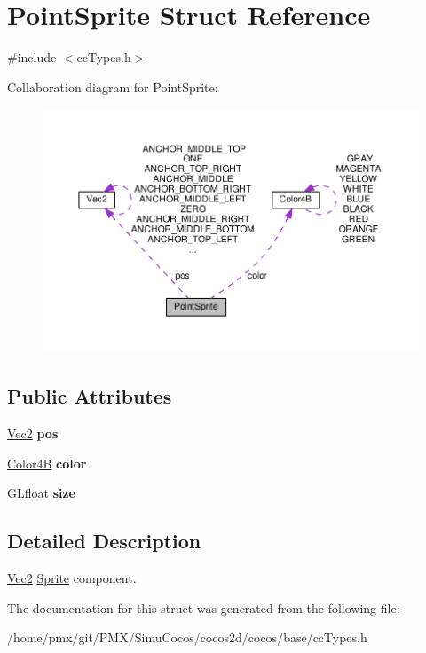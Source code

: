 \hypertarget{structPointSprite}{}\section{Point\+Sprite Struct Reference}
\label{structPointSprite}


{\ttfamily \#include $<$cc\+Types.\+h$>$}



Collaboration diagram for Point\+Sprite\+:
\nopagebreak
\begin{figure}[H]
\begin{center}
\leavevmode
\includegraphics[width=350pt]{structPointSprite__coll__graph}
\end{center}
\end{figure}
\subsection*{Public Attributes}
\begin{DoxyCompactItemize}
\item 
\mbox{\label{structPointSprite_a866d795eeaac2baa4967f1851b3e9049}} 
\hyperlink{classVec2}{Vec2} {\bfseries pos}
\item 
\mbox{\label{structPointSprite_a65cd2dcd61865f761a46e42a8f767587}} 
\hyperlink{structColor4B}{Color4B} {\bfseries color}
\item 
\mbox{\label{structPointSprite_a30cade9af6b4571ea222743d5f745b69}} 
G\+Lfloat {\bfseries size}
\end{DoxyCompactItemize}


\subsection{Detailed Description}
\hyperlink{classVec2}{Vec2} \hyperlink{classSprite}{Sprite} component. 

The documentation for this struct was generated from the following file\+:\begin{DoxyCompactItemize}
\item 
/home/pmx/git/\+P\+M\+X/\+Simu\+Cocos/cocos2d/cocos/base/cc\+Types.\+h\end{DoxyCompactItemize}
